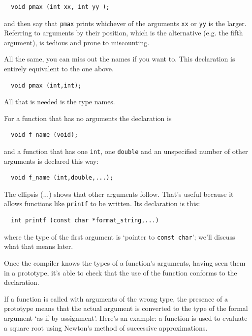 \begin{Verbatim}
  void pmax (int xx, int yy );
\end{Verbatim}

   and then say that \texttt{pmax} prints whichever of the arguments
    \texttt{xx} or \texttt{yy} is the larger. Referring to arguments
    by their position, which is the alternative (e.g. the fifth argument),
    is tedious and prone to miscounting.


   All the same, you can miss out the names if you want to. This
    declaration is entirely equivalent to the one above.

\begin{Verbatim}
  void pmax (int,int);
\end{Verbatim}

   All that is needed is the type names.


   For a function that has no arguments the declaration is

\begin{Verbatim}
  void f_name (void);
\end{Verbatim}

   and a function that has one \texttt{int}, one \texttt{double}
    and an unspecified number of other arguments is declared this way:

\begin{Verbatim}
  void f_name (int,double,...);
\end{Verbatim}

   The ellipsis (...) shows that other arguments follow. That's useful
    because it allows functions like \texttt{printf} to be written. Its
    declaration is this:

\begin{Verbatim}
  int printf (const char *format_string,...)
\end{Verbatim}

   where the type of the first argument is `pointer to \texttt{const
     char}'; we'll discuss what that means later.


   Once the compiler knows the types of a function's arguments, having
    seen them in a prototype, it's able to check that the use of the
    function conforms to the declaration.


   If a function is called with arguments of the wrong type, the presence
    of a prototype means that the actual argument is converted to the type
    of the formal argument `as if by assignment'. Here's an example: a
    function is used to evaluate a square root using Newton's method of
    successive approximations.


